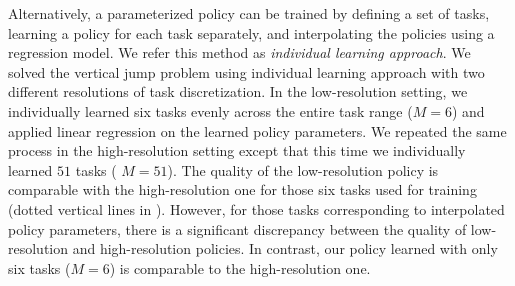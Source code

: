 Alternatively, a parameterized policy can be trained by defining a set
of tasks, learning a policy for each task separately, and
interpolating the policies using a regression model. We refer this
method as \emph{individual learning approach}. We solved the vertical
jump problem using individual learning approach with two different
resolutions of task discretization. In the low-resolution setting, we
individually learned six tasks evenly across the entire task range
(\ie $M = 6$) and applied linear regression on the learned policy
parameters. We repeated the same process in the high-resolution
setting except that this time we individually learned $51$ tasks (\ie
$M = 51$). The quality of the low-resolution policy is comparable
with the high-resolution one for those six tasks used for training
(dotted vertical lines in ). However, for those tasks
corresponding to interpolated policy parameters, there is a significant
discrepancy between the quality of low-resolution and
high-resolution policies. In contrast, our policy learned with only
six tasks ($M=6$) is comparable to the high-resolution
one.


